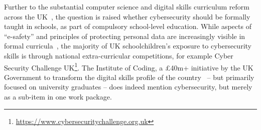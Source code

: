\documentclass[conference]{IEEEtran}
\begin{document}
Further to the substantial computer science and digital skills curriculum reform across the UK~\cite{wgictreview:2013,brown-et-al:toce2014,tryfonas+crick:petra2018}, the question is raised whether cybersecurity should be formally taught in schools, as part of compulsory school-level education. While aspects of ``e-safety'' and principles of protecting personal data are increasingly visible in formal curricula~\cite{moller+crick:jce2018}, the majority of UK schoolchildren's exposure to cybersecurity skills is through national extra-curricular competitions, for example Cyber Security Challenge UK\footnote{\url{https://www.cybersecuritychallenge.org.uk}}. The Institute of Coding, a \pounds40m+ initiative by the UK Government to transform the digital skills profile of the country~\cite{Davenportetal2019a} -- but primarily focused on university graduates -- does indeed mention cybersecurity, but merely as a sub-item in one work package.



\end{document}
